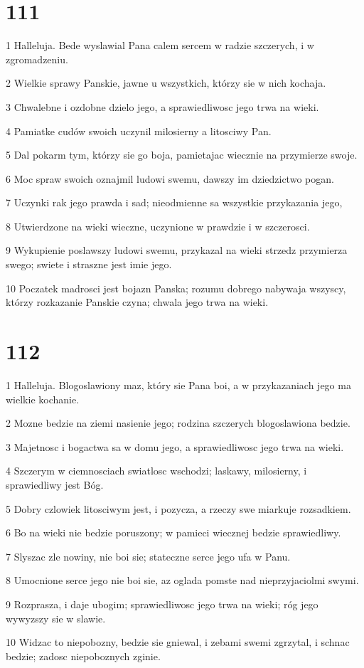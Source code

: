\chapter{111}

\par 1 Halleluja. Bede wyslawial Pana calem sercem w radzie szczerych, i w zgromadzeniu.
\par 2 Wielkie sprawy Panskie, jawne u wszystkich, którzy sie w nich kochaja.
\par 3 Chwalebne i ozdobne dzielo jego, a sprawiedliwosc jego trwa na wieki.
\par 4 Pamiatke cudów swoich uczynil milosierny a litosciwy Pan.
\par 5 Dal pokarm tym, którzy sie go boja, pamietajac wiecznie na przymierze swoje.
\par 6 Moc spraw swoich oznajmil ludowi swemu, dawszy im dziedzictwo pogan.
\par 7 Uczynki rak jego prawda i sad; nieodmienne sa wszystkie przykazania jego,
\par 8 Utwierdzone na wieki wieczne, uczynione w prawdzie i w szczerosci.
\par 9 Wykupienie poslawszy ludowi swemu, przykazal na wieki strzedz przymierza swego; swiete i straszne jest imie jego.
\par 10 Poczatek madrosci jest bojazn Panska; rozumu dobrego nabywaja wszyscy, którzy rozkazanie Panskie czyna; chwala jego trwa na wieki.

\chapter{112}

\par 1 Halleluja. Blogoslawiony maz, który sie Pana boi, a w przykazaniach jego ma wielkie kochanie.
\par 2 Mozne bedzie na ziemi nasienie jego; rodzina szczerych blogoslawiona bedzie.
\par 3 Majetnosc i bogactwa sa w domu jego, a sprawiedliwosc jego trwa na wieki.
\par 4 Szczerym w ciemnosciach swiatlosc wschodzi; laskawy, milosierny, i sprawiedliwy jest Bóg.
\par 5 Dobry czlowiek litosciwym jest, i pozycza, a rzeczy swe miarkuje rozsadkiem.
\par 6 Bo na wieki nie bedzie poruszony; w pamieci wiecznej bedzie sprawiedliwy.
\par 7 Slyszac zle nowiny, nie boi sie; stateczne serce jego ufa w Panu.
\par 8 Umocnione serce jego nie boi sie, az oglada pomste nad nieprzyjaciolmi swymi.
\par 9 Rozprasza, i daje ubogim; sprawiedliwosc jego trwa na wieki; róg jego wywyzszy sie w slawie.
\par 10 Widzac to niepobozny, bedzie sie gniewal, i zebami swemi zgrzytal, i schnac bedzie; zadosc niepoboznych zginie.

